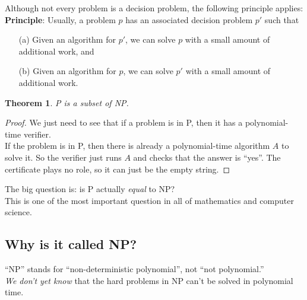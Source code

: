 \documentclass[12pt]{article}
\theoremstyle{plain}
\newtheorem{theorem}{Theorem}[subsection]
\theoremstyle{definition}
\begin{document}
Although not every problem is a decision problem, the following principle applies: \\
\textbf{Principle}: Usually, a problem $p$ has an associated decision problem $p'$ such that
\begin{itemize}
  \item[(a)] Given an algorithm for $p'$, we can solve $p$ with a small amount of additional work, and
  \item[(b)] Given an algorithm for $p$, we can solve $p'$ with a small amount of additional work.
\end{itemize}

\begin{theorem}
P is a subset of NP.
\end{theorem}
\begin{proof}
We just need to see that if a problem is in P, then it has a polynomial-time verifier. \\
If the problem is in P, then there is already a polynomial-time algorithm $A$ to solve it.
So the verifier just runs $A$ and checks that the answer is ``yes''.
The certificate plays no role, so it can just be the empty string.
\end{proof}

The big question is: is P actually \emph{equal} to NP? \\
This is one of the most important question in all of mathematics and computer science.

\subsection{Why is it called NP?}
``NP'' stands for ``non-deterministic polynomial'', not ``not polynomial.'' \\
\emph{We don't yet know} that the hard problems in NP can't be solved in polynomial time. \\
\end{document}
